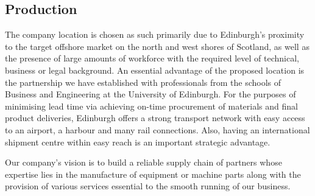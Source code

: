 \documentclass[a4paper,11pt]{article}
\begin{document}
\subsection{Production}
The company location is chosen as such primarily due to Edinburgh's proximity to the target offshore market on the north and west shores of Scotland, as well as the presence of large amounts of workforce with the required level of technical, business or legal background. An essential advantage of the proposed location is the partnership we have established with professionals from the schools of Business and Engineering at the University of Edinburgh. For the purposes of minimising lead time via achieving on-time procurement of materials and final product deliveries, Edinburgh offers a strong transport network with easy access to an airport, a harbour and many rail connections. Also, having an international shipment centre within easy reach is an important strategic advantage.

Our company's vision is to build a reliable supply chain of partners whose expertise lies in the manufacture of equipment or machine parts along with the provision of various services essential to the smooth running of our business.
\end{document}
